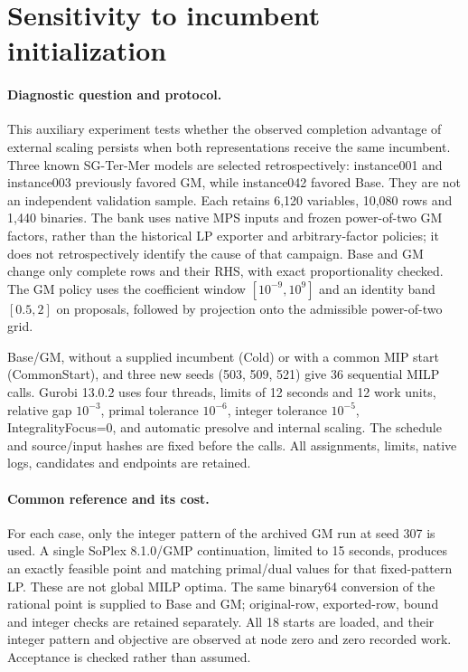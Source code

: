 \documentclass[11pt]{article}
\begin{document}
\FloatBarrier
\section{Sensitivity to incumbent initialization}
\label{sec:si-incumbent}
\begingroup
{}
\paragraph{Diagnostic question and protocol.}
This auxiliary experiment tests whether the observed completion advantage of external
scaling persists when both representations receive the same incumbent. Three known
SG-Ter-Mer models are selected retrospectively: instance001 and instance003 previously
favored GM, while instance042 favored Base. They are not an independent validation
sample. Each retains 6,120 variables, 10,080 rows and 1,440 binaries. The bank uses native
MPS inputs and frozen power-of-two GM factors, rather than the historical LP exporter and
arbitrary-factor policies; it does not retrospectively identify the cause of that campaign.
Base and GM change only complete rows and their RHS, with exact proportionality checked.
The GM policy uses the coefficient window $[10^{-9},10^9]$ and an identity band
$[0.5,2]$ on proposals, followed by projection onto the admissible power-of-two grid.

Base/GM, without a supplied incumbent (Cold) or with a common MIP start (CommonStart),
and three new seeds (503, 509, 521) give 36 sequential MILP calls. Gurobi 13.0.2 uses
four threads, limits of 12 seconds and 12 work units, relative gap $10^{-3}$, primal
tolerance $10^{-6}$, integer tolerance $10^{-5}$, IntegralityFocus=0, and automatic
presolve and internal scaling. The schedule and source/input hashes are fixed before
the calls. All assignments, limits, native logs, candidates and endpoints are retained.

\paragraph{Common reference and its cost.}
For each case, only the integer pattern of the archived GM run at seed 307 is used.
A single SoPlex 8.1.0/GMP continuation, limited to 15 seconds, produces an exactly
feasible point and matching primal/dual values for that fixed-pattern LP. These are
not global MILP optima. The same binary64 conversion of the rational point is supplied
to Base and GM; original-row, exported-row, bound and integer checks are retained
separately. All 18 starts are loaded, and their integer pattern and objective are
observed at node zero and zero recorded work. Acceptance is checked rather than assumed.
\end{document}
